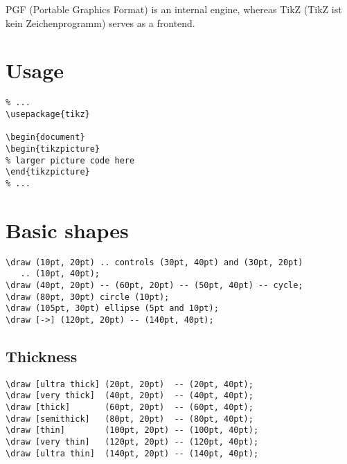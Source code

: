 \documentclass{programmingnotes}
\begin{document}
\renewcommand{\footrulewidth}{0.4pt}

\begin{multicols*}{2}
PGF (Portable Graphics Format) is an internal engine, 
whereas TikZ (TikZ ist kein Zeichenprogramm) serves as a frontend.

\section*{Usage}
\begin{verbatim}
% ...
\usepackage{tikz}

\begin{document}
\begin{tikzpicture}
% larger picture code here
\end{tikzpicture}
% ...
\end{verbatim}

\section*{Basic shapes}
\begin{verbatim}
\draw (10pt, 20pt) .. controls (30pt, 40pt) and (30pt, 20pt) 
   .. (10pt, 40pt);
\draw (40pt, 20pt) -- (60pt, 20pt) -- (50pt, 40pt) -- cycle; 
\draw (80pt, 30pt) circle (10pt);
\draw (105pt, 30pt) ellipse (5pt and 10pt);
\draw [->] (120pt, 20pt) -- (140pt, 40pt);
\end{verbatim}

\begin{center}
\end{center}

\subsection*{Thickness}
\begin{verbatim}
\draw [ultra thick] (20pt, 20pt)  -- (20pt, 40pt);
\draw [very thick]  (40pt, 20pt)  -- (40pt, 40pt);
\draw [thick]       (60pt, 20pt)  -- (60pt, 40pt);
\draw [semithick]   (80pt, 20pt)  -- (80pt, 40pt);
\draw [thin]        (100pt, 20pt) -- (100pt, 40pt);
\draw [very thin]   (120pt, 20pt) -- (120pt, 40pt);
\draw [ultra thin]  (140pt, 20pt) -- (140pt, 40pt);
\end{verbatim}


\end{multicols*}
\end{document}
